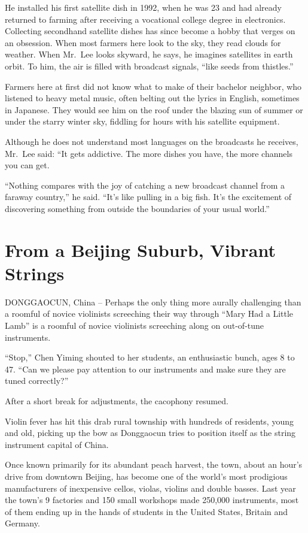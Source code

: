 ﻿\documentclass[12pt]{article}
\begin{document}
He installed his first satellite dish in 1992, when he was 23 and had already returned to farming
after receiving a vocational college degree in electronics. Collecting secondhand satellite dishes
has since become a hobby that verges on an obsession. When most farmers here look to the sky, they
read clouds for weather. When Mr.~Lee looks skyward, he says, he imagines satellites in earth orbit.
To him, the air is filled with broadcast signals, ``like seeds from thistles.''

Farmers here at first did not know what to make of their bachelor neighbor, who listened to heavy
metal music, often belting out the lyrics in English, sometimes in Japanese. They would see him on
the roof under the blazing sun of summer or under the starry winter sky, fiddling for hours with his
satellite equipment.

Although he does not understand most languages on the broadcasts he receives, Mr.~Lee said: ``It
gets addictive. The more dishes you have, the more channels you can get.

``Nothing compares with the joy of catching a new broadcast channel from a faraway country,'' he
said. ``It's like pulling in a big fish. It's the excitement of discovering something from outside
the boundaries of your usual world.''

\section{From a Beijing Suburb, Vibrant Strings}

DONGGAOCUN, China -- Perhaps the only thing more aurally challenging than a roomful of novice
violinists screeching their way through ``Mary Had a Little Lamb'' is a roomful of novice violinists
screeching along on out-of-tune instruments.

``Stop,'' Chen Yiming shouted to her students, an enthusiastic bunch, ages 8 to 47. ``Can we please
pay attention to our instruments and make sure they are tuned correctly?''

After a short break for adjustments, the cacophony resumed.

Violin fever has hit this drab rural township with hundreds of residents, young and old, picking up
the bow as Donggaocun tries to position itself as the string instrument capital of China.

Once known primarily for its abundant peach harvest, the town, about an hour's drive from downtown
Beijing, has become one of the world's most prodigious manufacturers of inexpensive cellos, violas,
violins and double basses. Last year the town's 9 factories and 150 small workshops made 250,000
instruments, most of them ending up in the hands of students in the United States, Britain and
Germany.
\end{document}
